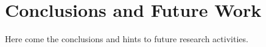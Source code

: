 \chapter{Conclusions and Future Work}
\label{ch:conclusions}
Here come the conclusions and hints to future research activities. 

